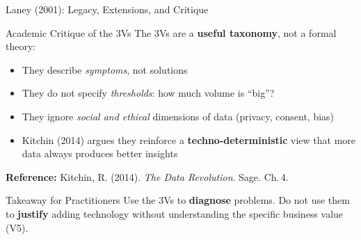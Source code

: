 \documentclass[aspectratio=169,10pt]{beamer}
\begin{document}
\begin{frame}{Laney (2001): Legacy, Extensions, and Critique}
  
      \begin{alertblock}{Academic Critique of the 3Vs}
        The 3Vs are a \textbf{useful taxonomy}, not a formal theory:
        \vspace{4pt}
        \begin{itemize}
          \item They describe \emph{symptoms}, not solutions
          \item They do not specify \emph{thresholds}: how much volume is ``big''?
          \item They ignore \emph{social and ethical} dimensions of data (privacy, consent, bias)
          \item Kitchin (2014) argues they reinforce a \textbf{techno-deterministic} view that more data always produces better insights
        \end{itemize}
        \vspace{4pt}
        \textbf{Reference:} Kitchin, R. (2014). \textit{The Data Revolution}. Sage. Ch.\,4.
      \end{alertblock}
      \vspace{4pt}
      \begin{block}{Takeaway for Practitioners}
        Use the 3Vs to \textbf{diagnose} problems.  Do not use them to \textbf{justify} adding technology without understanding the specific business value (V5).
      \end{block}
 
\end{frame}
\end{document}
